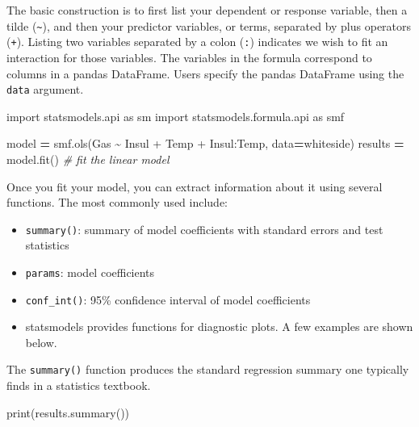 \documentclass[
]{book}
\newenvironment{Shaded}{\begin{snugshade}}{\end{snugshade}}
\newcommand{\BuiltInTok}[1]{#1}
\newcommand{\CommentTok}[1]{\textcolor[rgb]{0.56,0.35,0.01}{\textit{#1}}}
\newcommand{\ImportTok}[1]{#1}
\newcommand{\NormalTok}[1]{#1}
\newcommand{\OperatorTok}[1]{\textcolor[rgb]{0.81,0.36,0.00}{\textbf{#1}}}
\newcommand{\StringTok}[1]{\textcolor[rgb]{0.31,0.60,0.02}{#1}}
\providecommand{\tightlist}{%
  \setlength{\itemsep}{0pt}\setlength{\parskip}{0pt}}
\begin{document}
The basic construction is to first list your dependent or response variable, then a tilde (\texttt{\textasciitilde{}}), and then your predictor variables, or terms, separated by plus operators (\texttt{+}). Listing two variables separated by a colon (\texttt{:}) indicates we wish to fit an interaction for those variables. The variables in the formula correspond to columns in a pandas DataFrame. Users specify the pandas DataFrame using the \texttt{data} argument.

\begin{Shaded}
\begin{Highlighting}[]
\ImportTok{import}\NormalTok{ statsmodels.api }\ImportTok{as}\NormalTok{ sm}
\ImportTok{import}\NormalTok{ statsmodels.formula.api }\ImportTok{as}\NormalTok{ smf}

\NormalTok{model }\OperatorTok{=}\NormalTok{ smf.ols(}\StringTok{\textquotesingle{}Gas \textasciitilde{} Insul + Temp + Insul:Temp\textquotesingle{}}\NormalTok{, data}\OperatorTok{=}\NormalTok{whiteside)}
\NormalTok{results }\OperatorTok{=}\NormalTok{ model.fit() }\CommentTok{\# fit the linear model}
\end{Highlighting}
\end{Shaded}

Once you fit your model, you can extract information about it using several functions. The most commonly used include:

\begin{itemize}
\tightlist
\item
  \texttt{summary()}: summary of model coefficients with standard errors and test statistics
\item
  \texttt{params}: model coefficients
\item
  \texttt{conf\_int()}: 95\% confidence interval of model coefficients
\item
  statsmodels provides functions for diagnostic plots. A few examples are shown below.
\end{itemize}

The \texttt{summary()} function produces the standard regression summary one typically finds in a statistics textbook.

\begin{Shaded}
\begin{Highlighting}[]
\BuiltInTok{print}\NormalTok{(results.summary())}
\end{Highlighting}
\end{Shaded}
\end{document}
